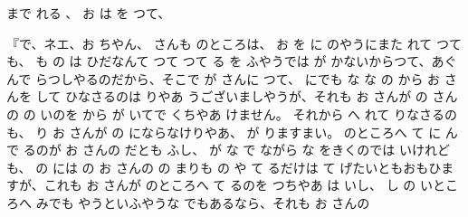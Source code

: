まで
れる
、
お
は
を
つて、

『で、ネエ、お
ちやん、
さんも
のところは、
お
を
に
のやうにまた
れて
つても、
も
の
は
ひだなんて
つて
つて
る
を
ふやうでは
が
かないからつて、あぐんで
らつしやるのだから、そこで
が
さんに
つて、
にでも
な
な
の
から
お
さんを
して
ひなさるのは
りやあ
うございましやうが、それも
お
さんが
の
さんの
の
いのを
から
が
いてで
くちやあ
けません。
それから
へ
れて
りなさるのも、
り
お
さんが
の
にならなけりやあ、
が
りますまい。
のところへ
て
に
んで
るのが
お
さんの
だとも
ふし、
が
な
で
ながら
な
をきくのでは
いけれども、
の
には
の
お
さんの
の
まりも
の
や
て
るだけは
て
げたいともおもひますが、これも
お
さんが
のところへ
て
るのを
つちやあ
は
いし、
し
の
いところへ
みでも
やうといふやうな
でもあるなら、それも
お
さんの
